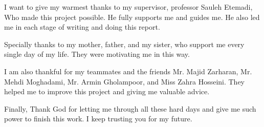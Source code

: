 
I want to give my warmest thanks to my supervisor, professor Sauleh Etemadi, Who made this project possible. He fully supports me and guides me. He also led me in each stage of writing and doing this report.  

Specially thanks to my mother, father, and my sister, who support me every single day of my life. They were motivating me in this way.

I am also thankful for my teammates and the friends Mr. Majid Zarharan, Mr. Mehdi Moghadami, Mr. Armin Gholampoor, and Miss Zahra Hosseini. They helped me to improve this project and giving me valuable advice. 

Finally, Thank God for letting me through all these hard days and give me such power to finish this work. I keep trusting you for my future.  	